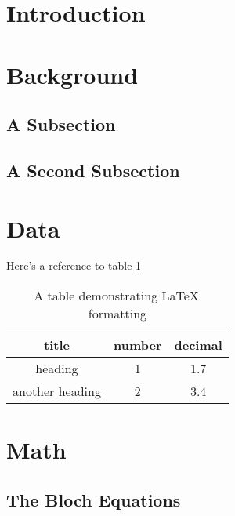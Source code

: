 \documentclass{workreport}
\begin{document}
\begin{body}
\section{Introduction}

\lipsum[1-6]

\section{Background}

\lipsum[1-2]

	\subsection{A Subsection}

	\lipsum[1]

	\subsection{A Second Subsection}

	\lipsum[2]

\section{Data}

\lipsum[1-2]

Here's a reference to table \ref{tbl:exampletable}

\begin{table}
	\centering
	\begin{tabular}{|c|c|c|} \hline
		title & number & decimal \\ \hline
		heading & 1 & 1.7 \\ \hline
		another heading & 2 & 3.4 \\ \hline
	\end{tabular}
	\caption{A table demonstrating \LaTeX \, formatting}
	\label{tbl:exampletable}
\end{table}

\section{Math}

\lipsum[1]

\subsection{The Bloch Equations}


\end{body}
\end{document}
